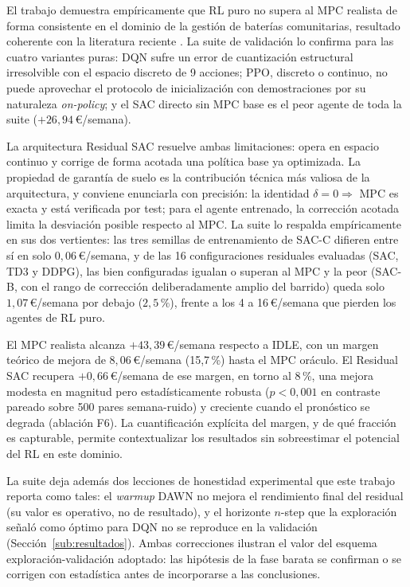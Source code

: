 \documentclass[12pt, a4paper, twoside]{report}
\begin{document}
El trabajo demuestra empíricamente que RL puro no supera al MPC realista de
forma consistente en el dominio de la gestión de baterías comunitarias, resultado
coherente con la literatura reciente \citep{Zhan2023}. La suite de validación
lo confirma para las cuatro variantes puras: DQN sufre un error de
cuantización estructural irresolvible con el espacio discreto de 9 acciones;
PPO, discreto o continuo, no puede aprovechar el protocolo de inicialización
con demostraciones por su naturaleza \textit{on-policy}; y el SAC directo sin
MPC base es el peor agente de toda la suite ($+26{,}94$\,€/semana).

La arquitectura Residual SAC resuelve ambas limitaciones: opera en espacio
continuo y corrige de forma acotada una política base ya optimizada. La
propiedad de garantía de suelo es la contribución técnica más valiosa de la
arquitectura, y conviene enunciarla con precisión: la identidad $\delta=0
\Rightarrow$ MPC es exacta y está verificada por test; para el agente
entrenado, la corrección acotada limita la desviación posible respecto al MPC.
La suite lo respalda empíricamente en sus dos vertientes: las tres semillas de
entrenamiento de SAC-C difieren entre sí en solo $0{,}06$\,€/semana, y de las
16 configuraciones residuales evaluadas (SAC, TD3 y DDPG), las bien
configuradas igualan o superan al MPC y la peor (SAC-B, con el rango de
corrección deliberadamente amplio del barrido) queda solo $1{,}07$\,€/semana
por debajo ($2{,}5\,\%$), frente a los 4 a 16\,€/semana que pierden los
agentes de RL puro.

El MPC realista alcanza $+43{,}39$\,€/semana respecto a IDLE, con un margen
teórico de mejora de $8{,}06$\,€/semana (15{,}7\,\%) hasta el MPC oráculo. El
Residual SAC recupera $+0{,}66$\,€/semana de ese margen, en torno al 8\,\%,
una mejora modesta en magnitud pero estadísticamente robusta ($p<0{,}001$ en
contraste pareado sobre 500 pares semana-ruido) y creciente cuando el
pronóstico se degrada (ablación F6). La cuantificación explícita del margen, y
de qué fracción es capturable, permite contextualizar los resultados sin
sobreestimar el potencial del RL en este dominio.

La suite deja además dos lecciones de honestidad experimental que este trabajo
reporta como tales: el \textit{warmup} DAWN no mejora el rendimiento final del
residual (su valor es operativo, no de resultado), y el horizonte $n$-step que
la exploración señaló como óptimo para DQN no se reproduce en la validación
(Sección~\ref{sub:resultados}). Ambas correcciones ilustran el valor del
esquema exploración-validación adoptado: las hipótesis de la fase barata se
confirman o se corrigen con estadística antes de incorporarse a las
conclusiones.
\end{document}
